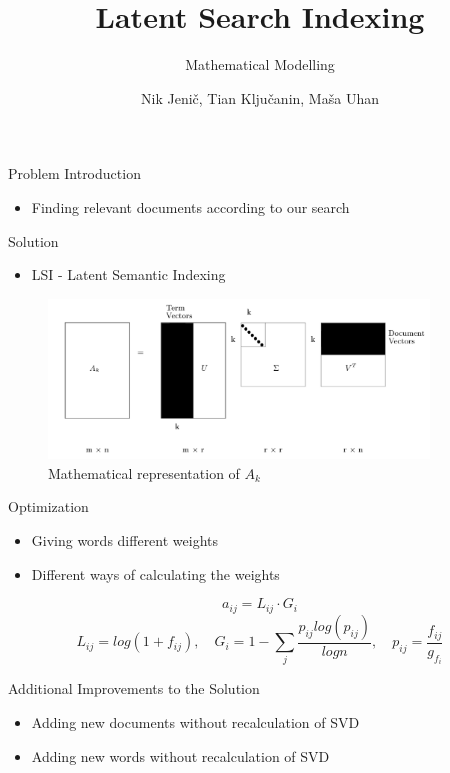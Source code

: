 \documentclass{beamer}
\title{Latent Search Indexing}
\subtitle{Mathematical Modelling}
\author{Nik Jenič, Tian Ključanin, Maša Uhan}
\date{}
\begin{document}
\frame{\titlepage}

\begin{frame}{Problem Introduction}
    \begin{itemize}
        \item Finding relevant documents according to our search
    \end{itemize}
\end{frame}

\begin{frame}{Solution}
    \begin{itemize}
        \item LSI - Latent Semantic Indexing
    \end{itemize}
    \begin{figure}
        \centering
        \includegraphics[width=0.9\textwidth]{../Slike/svd.png}
        \caption{Mathematical representation of $A_k$}
        \label{fig:matrixA}
      \end{figure}
\end{frame}

\begin{frame}{Optimization}
    \begin{itemize}
        \item Giving words different weights
        \item Different ways of calculating the weights
    \end{itemize}
    \begin{center}
        \[
            a_{ij} = L_{ij} \cdot G_i
        \]
        \[
            L_{ij} = log(1 + f_{ij}), \quad G_i = 1 - \sum_{j} \frac{p_{ij} log(p_{ij})}{log n}, \quad p_{ij} = \frac{f_{ij}}{g_{f_i}}
        \]
    \end{center}
\end{frame}

\begin{frame}{Additional Improvements to the Solution}
    \begin{itemize}
        \item Adding new documents without recalculation of SVD
        \item Adding new words without recalculation of SVD
    \end{itemize}
\end{frame}
\end{document}
